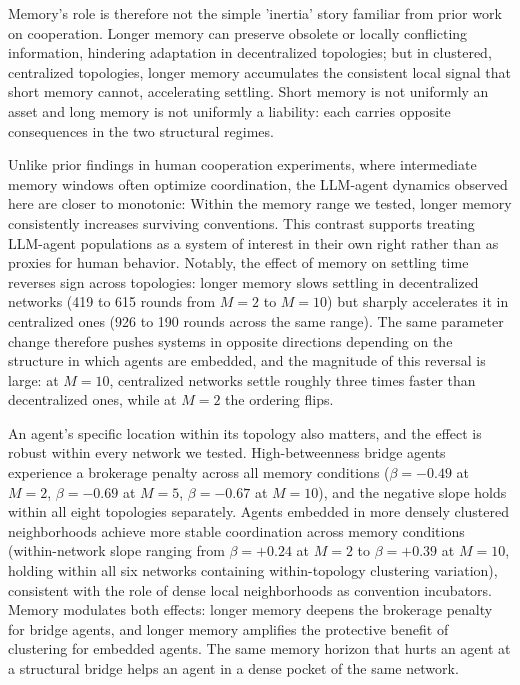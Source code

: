 \documentclass{article}
\begin{document}
Memory's role is therefore not the simple 'inertia' story familiar from prior work on cooperation. Longer memory can preserve obsolete or locally conflicting information, hindering adaptation in decentralized topologies; but in clustered, centralized topologies, longer memory accumulates the consistent local signal that short memory cannot, accelerating settling. Short memory is not uniformly an asset and long memory is not uniformly a liability: each carries opposite consequences in the two structural regimes.

Unlike prior findings in human cooperation experiments, where intermediate memory windows often optimize coordination, the LLM-agent dynamics observed here are closer to monotonic: Within the memory range we tested, longer memory consistently increases surviving conventions. This contrast supports treating LLM-agent populations as a system of interest in their own right rather than as proxies for human behavior. Notably, the effect of memory on settling time reverses sign across topologies: longer memory slows settling in decentralized networks (419 to 615 rounds from $M=2$ to $M=10$) but sharply accelerates it in centralized ones (926 to 190 rounds across the same range). The same parameter change therefore pushes systems in opposite directions depending on the structure in which agents are embedded, and the magnitude of this reversal is large: at $M=10$, centralized networks settle roughly three times faster than decentralized ones, while at $M=2$ the ordering flips. 

An agent's specific location within its topology also matters, and the effect is robust within every network we tested. High-betweenness bridge agents experience a brokerage penalty across all memory conditions ($\beta = -0.49$ at $M=2$, $\beta = -0.69$ at $M=5$, $\beta = -0.67$ at $M=10$), and the negative slope holds within all eight topologies separately. Agents embedded in more densely clustered neighborhoods achieve more stable coordination across memory conditions (within-network slope ranging from $\beta = +0.24$ at $M=2$ to $\beta = +0.39$ at $M=10$, holding within all six networks containing within-topology clustering variation), consistent with the role of dense local neighborhoods as convention incubators. Memory modulates both effects: longer memory deepens the brokerage penalty for bridge agents, and longer memory amplifies the protective benefit of clustering for embedded agents. The same memory horizon that hurts an agent at a structural bridge helps an agent in a dense pocket of the same network.
\end{document}
